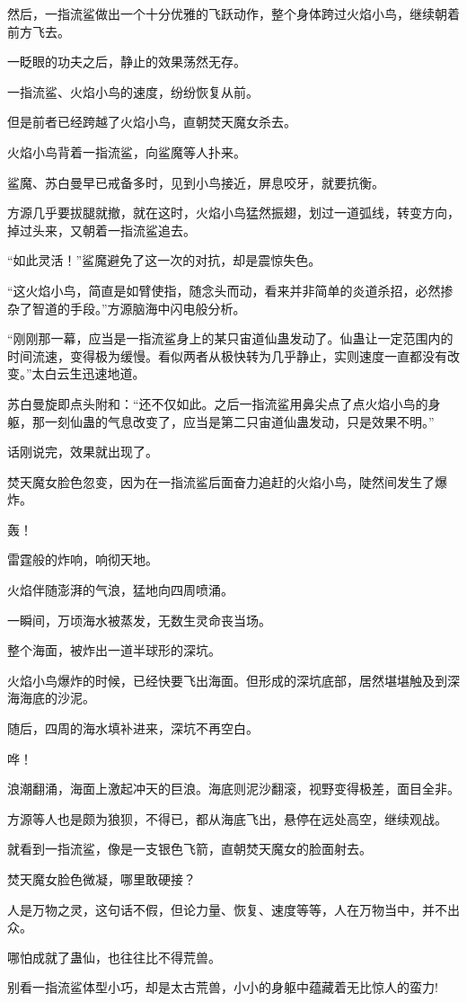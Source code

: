 \begin{this_body}
然后，一指流鲨做出一个十分优雅的飞跃动作，整个身体跨过火焰小鸟，继续朝着前方飞去。

一眨眼的功夫之后，静止的效果荡然无存。

一指流鲨、火焰小鸟的速度，纷纷恢复从前。

但是前者已经跨越了火焰小鸟，直朝焚天魔女杀去。

火焰小鸟背着一指流鲨，向鲨魔等人扑来。

鲨魔、苏白曼早已戒备多时，见到小鸟接近，屏息咬牙，就要抗衡。

方源几乎要拔腿就撤，就在这时，火焰小鸟猛然振翅，划过一道弧线，转变方向，掉过头来，又朝着一指流鲨追去。

“如此灵活！”鲨魔避免了这一次的对抗，却是震惊失色。

“这火焰小鸟，简直是如臂使指，随念头而动，看来并非简单的炎道杀招，必然掺杂了智道的手段。”方源脑海中闪电般分析。

“刚刚那一幕，应当是一指流鲨身上的某只宙道仙蛊发动了。仙蛊让一定范围内的时间流速，变得极为缓慢。看似两者从极快转为几乎静止，实则速度一直都没有改变。”太白云生迅速地道。

苏白曼旋即点头附和：“还不仅如此。之后一指流鲨用鼻尖点了点火焰小鸟的身躯，那一刻仙蛊的气息改变了，应当是第二只宙道仙蛊发动，只是效果不明。”

话刚说完，效果就出现了。

焚天魔女脸色忽变，因为在一指流鲨后面奋力追赶的火焰小鸟，陡然间发生了爆炸。

轰！

雷霆般的炸响，响彻天地。

火焰伴随澎湃的气浪，猛地向四周喷涌。

一瞬间，万顷海水被蒸发，无数生灵命丧当场。

整个海面，被炸出一道半球形的深坑。

火焰小鸟爆炸的时候，已经快要飞出海面。但形成的深坑底部，居然堪堪触及到深海海底的沙泥。

随后，四周的海水填补进来，深坑不再空白。

哗！

浪潮翻涌，海面上激起冲天的巨浪。海底则泥沙翻滚，视野变得极差，面目全非。

方源等人也是颇为狼狈，不得已，都从海底飞出，悬停在远处高空，继续观战。

就看到一指流鲨，像是一支银色飞箭，直朝焚天魔女的脸面射去。

焚天魔女脸色微凝，哪里敢硬接？

人是万物之灵，这句话不假，但论力量、恢复、速度等等，人在万物当中，并不出众。

哪怕成就了蛊仙，也往往比不得荒兽。

别看一指流鲨体型小巧，却是太古荒兽，小小的身躯中蕴藏着无比惊人的蛮力!

\end{this_body}

